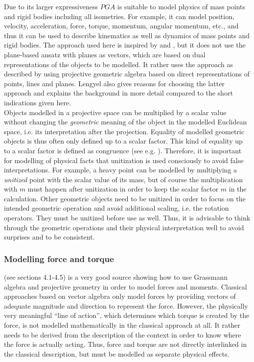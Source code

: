 Due to its larger expressiveness $PGA$ is suitable to model physics of mass points and
rigid bodies including all isometries. For example, it can model position, velocity,
acceleration, force, torque, momentum, angular momentum, etc., and thus it can be used to
describe kinematics as well as dynamics of mass points and rigid bodies. The approach used
here is inspired by \cite{Plane-based_PGA_Dorst-DeKennik:2022} and
\cite{Dynamics_in_PGA_plane-based_Dorst-DeKennik:2023}, but it does not use the
plane-based ansatz with planes as vectors, which are based on dual representations of the
objects to be modelled. It rather uses the approach as described by
\cite{Lengyel_pga-illuminated:2024} using projective geometric algebra based on direct
representations of points, lines and planes. Lengyel also gives reasons for choosing the
latter approach and explains the background in more detail compared to the short
indications given here. \\

Objects modelled in a projective space can be multiplied by a scalar value without
changing the \emph{geometric} meaning of the object in the modelled Euclidean space, i.e.
its interpretation after the projection. Equality of modelled geometric objects is thus
often only defined up to a scalar factor. This kind of equality up to a scalar factor is
defined as congruence (see e.g. \cite{Browne_Grassmann-Algebra_Vol1:2012}). Therefore, it
is important for modelling of physical facts that unitization is used consciously to avoid
false interpretations. For example, a heavy point can be modelled by multiplying a
\emph{unitized} point with the scalar value of its mass, but of course the multiplication
with $m$ must happen after unitization in order to keep the scalar factor $m$ in the
calculation. Other geometric objects need to be unitized in order to focus on the intended
geometric operation and avoid additional scaling, i.e. the rotation operators. They must
be unitized before use as well. Thus, it is advisable to think through the geometric
operations and their physical interpretation well to avoid surprises and to be consistent.


\newpage

\subsubsection{Modelling force and torque}
\label{subsubsection:modelling_force_and_torque}

\cite{Browne_Grassmann-Algebra_Vol1:2012} (see sections 4.1-4.5) is a very good source
showing how to use Grassmann algebra and projective geometry in order to model forces and
moments. Classical approaches based on vector algebra only model forces by providing
vectors of adequate magnitude and direction to represent the force. However, the
physically very meaningful ``line of action'', which determines which torque is created by
the force, is not modelled mathematically in the classical approach at all. It rather
needs to be derived from the description of the context in order to know where the force
is actually acting. Thus, force and torque are not directly interlinked in the classical
description, but must be modelled as separate physical effects.\\

